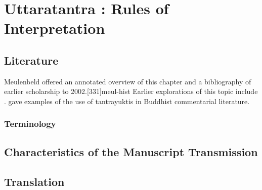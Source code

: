 
\chapter{Uttaratantra :  Rules of Interpretation}

\section{Literature} 

Meulenbeld offered an annotated overview of this chapter and a bibliography
of earlier scholarship to 2002.[331]{meul-hist}  Earlier explorations 
of this topic include \cite{dasg-1952,
    lele-1981,
    mejo-2000,
    nara-1949,
    ober-1967,
    scha-1993,
    sing-2003,
    muth-1976}. 
\citet{mane-2008} gave examples of the use of tantrayuktis in Buddhist 
commentarial literature.

\subsection{Terminology}



\section{Characteristics of the Manuscript Transmission}


\section{Translation}

